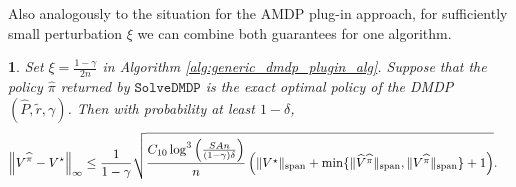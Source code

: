 \documentclass{article}
\theoremstyle{plain}
\newtheorem{thm}{\protect\theoremname}
\theoremstyle{plain}
\theoremstyle{remark}
\theoremstyle{plain}
\theoremstyle{plain}
\providecommand{\theoremname}{Theorem}
\newcommand{\Phat}{\widehat{P}}
\newcommand{\Vhat}{\widehat{V}}
\newcommand{\pihat}{\widehat{\pi}}
\newcommand{\SolveDMDP}{\texttt{SolveDMDP}}
\newcommand{\plugin}{plug-in\xspace}
\begin{document}
Also analogously to the situation for the AMDP \plugin approach, for sufficiently small perturbation $\xi$ we can combine both guarantees for one algorithm.
\begin{thm}
\label{thm:DMDP_best_of_both}
Set $\xi = \frac{1-\gamma}{2n}$ in Algorithm \ref{alg:generic_dmdp_plugin_alg}. Suppose that the policy $\pihat$ returned by $\SolveDMDP$ is the exact optimal policy of the DMDP $(\Phat, \widetilde{r}, \gamma)$. Then with probability at least $1 - \delta$,
    \begin{align*}
    \infnorm{V^{\pihat} - V^\star} &\leq  \frac{1 }{1-\gamma}\sqrt{\frac{C_{10}  \log^3 \left( \frac{SAn}{(1-\gamma) \delta }\right) }{n}\left( \spannorm{V^{\star}} + \min \{\spannorm{\Vhat^{\pihat}}, \spannorm{V^{\pihat}} \} + 1\right) }.
\end{align*}
\end{thm}
\end{document}
